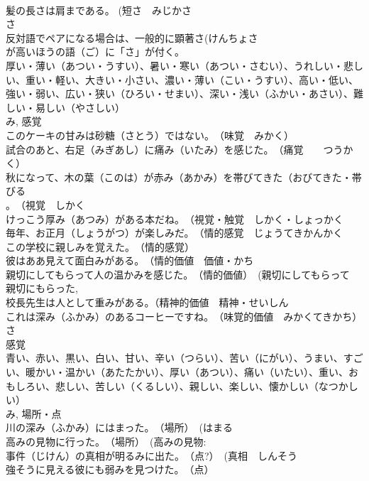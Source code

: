 \documentclass[8pt]{extreport}
\begin{document}
\begin{CJK}{UTF8}{min}
\\	髪の長さは肩まである。 (短さ　みじかさ 
\\	さ 
\\	反対語でペアになる場合は、一般的に顕著さ(けんちょさ 
\\	が高いほうの語（ご）に「さ」が付く。
\\	厚い・薄い（あつい・うすい）、暑い・寒い（あつい・さむい）、うれしい・悲しい、重い・軽い、大きい・小さい、濃い・薄い（こい・うすい）、高い・低い、強い・弱い、広い・狭い（ひろい・せまい）、深い・浅い（ふかい・あさい）、難しい・易しい（やさしい） 
\\	み, 感覚 
\\	このケーキの甘みは砂糖（さとう）ではない。　（味覚　みかく）
\\	試合のあと、右足（みぎあし）に痛み（いたみ）を感じた。　（痛覚　　つうかく）
\\	秋になって、木の葉（このは）が赤み（あかみ）を帯びてきた（おびてきた・帯びる 
\\	。　（視覚　しかく 
\\	けっこう厚み（あつみ）がある本だね。　（視覚・触覚　しかく・しょっかく 
\\	毎年、お正月（しょうがつ）が楽しみだ。　（情的感覚　じょうてきかんかく 
\\	この学校に親しみを覚えた。　（情的感覚）
\\	彼はああ見えて面白みがある。　（情的価値　価値・かち　
\\	親切にしてもらって人の温かみを感じた。　（情的価値）　(親切にしてもらって 
\\	親切にもらった, 
\\	校長先生は人として重みがある。（精神的価値　精神・せいしん 
\\	これは深み（ふかみ）のあるコーヒーですね。　（味覚的価値　みかくてきかち）
\\	さ 
\\	感覚 
\\	青い、赤い、黒い、白い、甘い、辛い（つらい）、苦い（にがい）、うまい、すごい、暖かい・温かい（あたたかい）、厚い（あつい）、痛い（いたい）、重い、おもしろい、悲しい、苦しい（くるしい）、親しい、楽しい、懐かしい（なつかしい）
\\	み, 場所・点 
\\	川の深み（ふかみ）にはまった。　（場所）　(はまる　
\\	高みの見物に行った。　（場所）　(高みの見物: 
\\	事件（じけん）の真相が明るみに出た。　（点?）　(真相　しんそう 
\\	強そうに見える彼にも弱みを見つけた。　（点）

\end{CJK}
\end{document}
